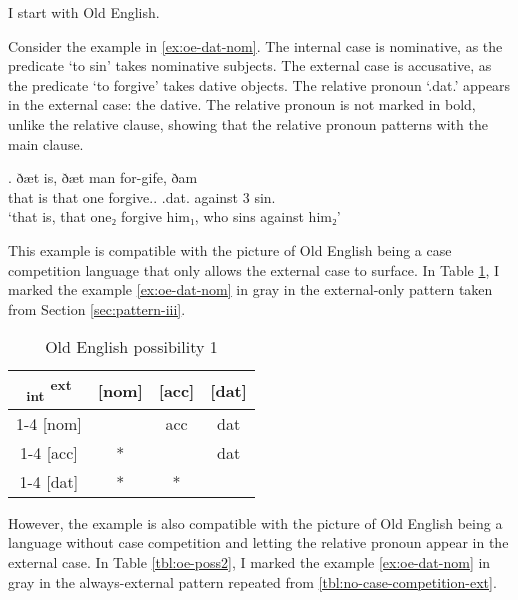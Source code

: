 I start with Old English.

Consider the example in \ref{ex:oe-dat-nom}.
The internal case is nominative, as the predicate  `to sin' takes nominative subjects.
The external case is accusative, as the predicate  `to forgive' takes dative objects.
The relative pronoun  `.\ac{dat}.' appears in the external case: the dative. The relative pronoun is not marked in bold, unlike the relative clause, showing that the relative pronoun patterns with the main clause.

\exg. ðæt is, ðæt man for-gife, ðam    \\
 that is that one forgive.. .\ac{dat}.  against 3 sin.\\
 `that is, that one₂ forgive him₁, who sins against him₂'  \label{ex:oe-dat-nom}

This example is compatible with the picture of Old English being a case competition language that only allows the external case to surface. In Table \ref{tbl:oe-poss1}, I marked the example \ref{ex:oe-dat-nom} in gray in the external-only pattern taken from Section \ref{sec:pattern-iii}.

 \begin{table}[H]
   \center
   \caption{Old English possibility 1}
   \begin{tabular}{c|c|c|c}
     \toprule
     \textsubscript{\ac{int}} \textsuperscript{\ac{ext}}
            & [\ac{nom}]
            & [\ac{acc}]
            & [\ac{dat}]
            \\ \cmidrule{1-4}
        [\ac{nom}]
            &
            & \ac{acc}
            & \cellcolor{LG}\ac{dat}
            \\ \cmidrule{1-4}
        [\ac{acc}]
            & *
            &
            & \ac{dat}
            \\ \cmidrule{1-4}
        [\ac{dat}]
            & *
            & *
            &
            \\
      \bottomrule
   \end{tabular}
     \label{tbl:oe-poss1}
 \end{table}

However, the example is also compatible with the picture of Old English being a language without case competition and letting the relative pronoun appear in the external case. In Table \ref{tbl:oe-poss2}, I marked the example \ref{ex:oe-dat-nom} in gray in the always-external pattern repeated from \ref{tbl:no-case-competition-ext}.

